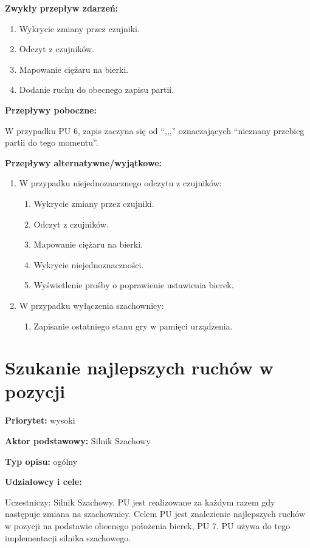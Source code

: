 \documentclass[12pt]{article}
\begin{document}
\textbf{Zwykły przepływ zdarzeń:}  
\begin{enumerate}
\item Wykrycie zmiany przez czujniki.
\item Odczyt z czujników.
\item Mapowanie ciężaru na bierki.
\item Dodanie ruchu do obecnego zapisu partii.
\end{enumerate} 

\textbf{Przepływy poboczne:}

W przypadku PU 6, zapis zaczyna się od “,,,” oznaczających “nieznany przebieg partii do tego momentu”.

\textbf{Przepływy alternatywne/wyjątkowe:}
\begin{enumerate}
\item W przypadku niejednoznacznego odczytu z czujników:
    \begin{enumerate}
    \item Wykrycie zmiany przez czujniki.
    \item Odczyt z czujników.
    \item Mapowanie ciężaru na bierki.
    \item Wykrycie niejednoznaczności.
    \item Wyświetlenie prośby o poprawienie ustawienia bierek.
    \end{enumerate}
\item W przypadku wyłączenia szachownicy:
    \begin{enumerate}
    \item Zapisanie ostatniego stanu gry w pamięci urządzenia.
    \end{enumerate}
\end{enumerate}



\section{Szukanie najlepszych ruchów w pozycji}

\textbf{Priorytet:} wysoki

\textbf{Aktor podstawowy:} Silnik Szachowy

\textbf{Typ opisu:} ogólny

\textbf{Udziałowcy i cele:} 

Uczestniczy: Silnik Szachowy. PU jest realizowane za każdym razem gdy następuje zmiana na szachownicy. Celem PU jest znalezienie najlepszych ruchów w pozycji na podstawie obecnego położenia bierek, PU 7. PU używa do tego implementacji silnika szachowego.
\end{document}
